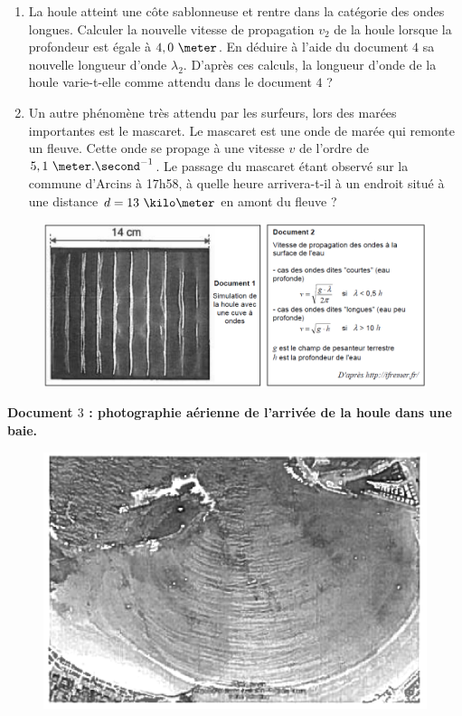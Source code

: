 \begin{enumerate}
\begin{enumerate}[label=(\alph*)]
\item La houle atteint une côte sablonneuse et rentre dans la catégorie des ondes longues.
Calculer la nouvelle vitesse de propagation $v_{2}$ de la houle lorsque la profondeur est égale à $4,0\text{ }\meter$. En déduire
à l'aide du document $4$ sa nouvelle longueur d'onde $\lambda_{2}$. D'après ces calculs, la longueur d'onde de la houle varie-t-elle comme attendu dans le document $4$ ?
\item Un autre phénomène très attendu par les surfeurs, lors des marées importantes est le mascaret. Le mascaret est une onde de marée qui remonte un fleuve. Cette onde se propage à une vitesse $v$ de l'ordre de $5,1\text{ }\meter.\second^{-1}$.\newline
Le passage du mascaret étant observé sur la commune d'Arcins à 17h58, à quelle heure arrivera-t-il à un endroit situé à une distance $d = 13\text{ }\kilo\meter$ en amont du fleuve ?
\end{enumerate}

\end{enumerate}

\begin{figure}[h]
\begin{center}
\includegraphics[width=\columnwidth]{images/Exo4_Ondes_Vagues}
\end{center}
\end{figure}

\vspace{0.3cm}

\textbf{Document $3$ : photographie aérienne de l'arrivée de la houle dans une baie.}

\begin{figure}[h]
\begin{center}
\includegraphics[width=0.5\columnwidth]{images/Exo4_Ondes_Vagues_Doc3}
\end{center}
\end{figure}

